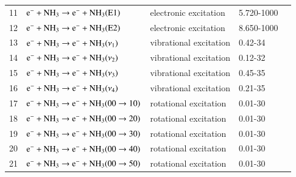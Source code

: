 \begin{table}[!htbp]
\begin{threeparttable}
\begin{tabular*}{\textwidth}{l@{\extracolsep{\fill}}llll}
      11 & $\rm e^- + NH_3 \rightarrow e^- + NH_3(E1)$  &  electronic excitation   &  5.720-1000 &\cite{lxc:2024:morgan}\\ 
      12 & $\rm e^- + NH_3 \rightarrow e^- + NH_3(E2)$  &  electronic excitation   &  8.650-1000 &\cite{lxc:2024:morgan}\\ 
      \midrule
      13 & $\rm e^- + NH_3 \rightarrow e^- + NH_3(\nu_1)$  &  vibrational excitation   &  0.42-34 &\cite{psst:2023:snoeckx}\\  
      14 & $\rm e^- + NH_3 \rightarrow e^- + NH_3(\nu_2)$  &  vibrational excitation   &  0.12-32 &\cite{psst:2023:snoeckx}\\ 
      15 & $\rm e^- + NH_3 \rightarrow e^- + NH_3(\nu_3)$  &  vibrational excitation   &  0.45-35 &\cite{psst:2023:snoeckx}\\ 
      16 & $\rm e^- + NH_3 \rightarrow e^- + NH_3(\nu_4)$  &  vibrational excitation   &  0.21-35 &\cite{psst:2023:snoeckx}\\ 
      \midrule
      17 & $\rm e^- + NH_3 \rightarrow e^- + NH_3(00\rightarrow10)$  &  rotational excitation   &  0.01-30 & \cite{psst:2023:snoeckx}\\ 
      18 & $\rm e^- + NH_3 \rightarrow e^- + NH_3(00\rightarrow20)$  &  rotational excitation   &  0.01-30 &\cite{psst:2023:snoeckx}\\ 
      19 & $\rm e^- + NH_3 \rightarrow e^- + NH_3(00\rightarrow30)$  &  rotational excitation   &  0.01-30 &\cite{psst:2023:snoeckx}\\ 
      20 & $\rm e^- + NH_3 \rightarrow e^- + NH_3(00\rightarrow40)$  &  rotational excitation   &  0.01-30 &\cite{psst:2023:snoeckx}\\ 
      21 & $\rm e^- + NH_3 \rightarrow e^- + NH_3(00\rightarrow50)$  &  rotational excitation   &  0.01-30 &\cite{psst:2023:snoeckx}\\ 
    \bottomrule
    \end{tabular*}
   \end{threeparttable}
\end{table}
%
